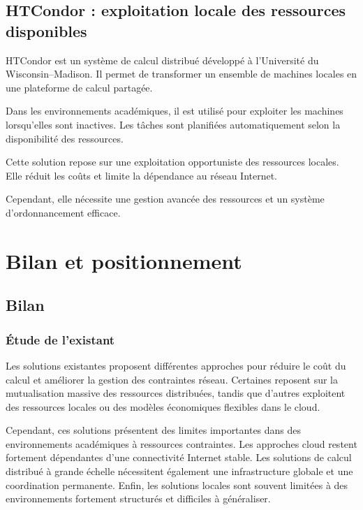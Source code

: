 \documentclass[12pt,a4paper]{report}
\theoremstyle{definition}
\begin{document}
\subsection{HTCondor : exploitation locale des ressources disponibles}

HTCondor est un système de calcul distribué développé à l’Université du Wisconsin--Madison\cite{htcondor}. Il permet de transformer un ensemble de machines locales en une plateforme de calcul partagée.

Dans les environnements académiques, il est utilisé pour exploiter les machines lorsqu’elles sont inactives. Les tâches sont planifiées automatiquement selon la disponibilité des ressources.

Cette solution repose sur une exploitation opportuniste des ressources locales. Elle réduit les coûts et limite la dépendance au réseau Internet.

Cependant, elle nécessite une gestion avancée des ressources et un système d’ordonnancement efficace.

\section{Bilan et positionnement}

\subsection{Bilan}

\subsubsection{Étude de l’existant}

Les solutions existantes proposent différentes approches pour réduire le coût du calcul et améliorer la gestion des contraintes réseau. Certaines reposent sur la mutualisation massive des ressources distribuées, tandis que d’autres exploitent des ressources locales ou des modèles économiques flexibles dans le cloud.

Cependant, ces solutions présentent des limites importantes dans des environnements académiques à ressources contraintes. Les approches cloud restent fortement dépendantes d’une connectivité Internet stable. Les solutions de calcul distribué à grande échelle nécessitent également une infrastructure globale et une coordination permanente. Enfin, les solutions locales sont souvent limitées à des environnements fortement structurés et difficiles à généraliser.
\end{document}
